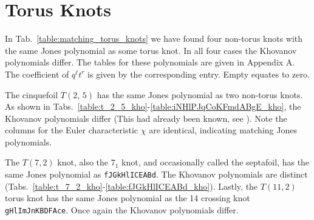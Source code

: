 \section{Torus Knots}
    \begin{table}
        \centering
        \caption{Knots whose Jones polynomial matches that of a Torus Knot}
        \label{table:matching_torus_knots}
    \end{table}
    In Tab.~\ref{table:matching_torus_knots}
    we have found four non-torus knots with the same
    Jones polynomial as some torus knot. In all four cases the Khovanov
    polynomials differ. The tables for these polynomials are given in
    Appendix A.
    The coefficient of $q^{\ell}t^{r}$ is given by the corresponding entry.
    Empty equates to zero.
    \par\hfill\par
    The cinquefoil $T(2,\,5)$ has the same Jones polynomial as two
    non-torus knots. As shown in
    Tabs.~\ref{table:t_2_5_kho}-\ref{table:iNHlPJqCoKFmdABgE_kho}, the
    Khovanov polynomials differ
    (This had already been known, see \cite{KatlasKhoHo}).
    Note the columns for the Euler characteristic $\chi$ are identical,
    indicating matching Jones polynomials.
    \par\hfill\par
    The $T(7,2)$ knot, also the $7_{1}$ knot, and occasionally called the
    septafoil, has the same Jones polynomial as \texttt{fJGkHlICEABd}. The
    Khovanov polynomials are distinct
    (Tabs.~\ref{table:t_7_2_kho}-\ref{table:fJGkHlICEABd_kho}).
    Lastly, the $T(11,2)$ torus knot has the same Jones polynomial as the
    14 crossing knot \texttt{gHlImJnKBDFAce}. Once again the Khovanov
    polynomials differ.
